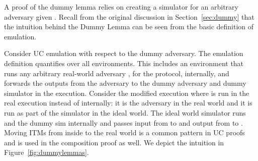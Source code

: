 A proof of the dummy lemma relies on creating a simulator \Sim for an arbitrary adversary given \DS.
Recall from the original discussion in Section~\ref{sec:dummy} that the intuition behind the Dummy Lemma can be seen from the basic definition of emulation.

Consider UC emulation with respect to the dummy adversary. The emulation definition quantifies over all environments. 
This includes an environment that runs any arbitrary real-world adversary \A, for the protocol, internally, and \Z forwards the outputs from the adversary to the dummy adversary and dummy simulator in the execution.
Consider the modified execution where \A is run in the real execution instead of internally: it is the adversary in the real world and it is run as part of the simulator in the ideal world.
The ideal world simulator runs \A and the dummy sim internally and passes input from \Z to \A and output from \A to \DS.
Moving ITMs from inside \Z to the real world is a common pattern in UC proofs and is used in the composition proof as well.
We depict the intuition in Figure~\ref{fig:dummylemmas}.

